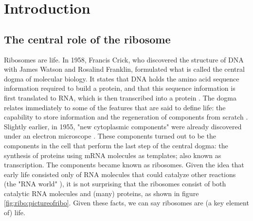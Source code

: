 
\section{Introduction}

\subsection{The central role of the ribosome}

Ribosomes are life.
%
In 1958, Francis Crick, who discovered the structure of DNA with James Watson and Rosalind Franklin,
formulated what is called the central dogma of molecular biology.
It states 
that DNA holds the amino acid sequence information required to build a protein, and that this sequence information is first translated to RNA, which is then transcribed into a protein \cite{Crick1958}.
% 
The dogma relates immediately to some of the features that are said to define life: 
the capability to store information and 
the regeneration of components from scratch \cite{Lawrence2005, Koshland2002}.
%
Slightly earlier, in 1955, "new cytoplasmic components" were already discovered under an electron microscope \cite{Palade1955}.
These components turned out to be the components in the cell that perform the last step of the central dogma: 
the synthesis of proteins using mRNA molecules as templates; also known as transcription.
The components became known as ribosomes.
%
Given the idea that early life consisted only of RNA molecules that could catalyze other reactions (the "RNA world" \cite{Campbell2002}), it is not surprising that the ribosomes 
consist of both catalytic RNA molecules and (many) proteins,
as shown in figure \ref{fig:ribo:pictureofribo}.
%
Given these facts, we can say ribosomes are (a key element of) life.


